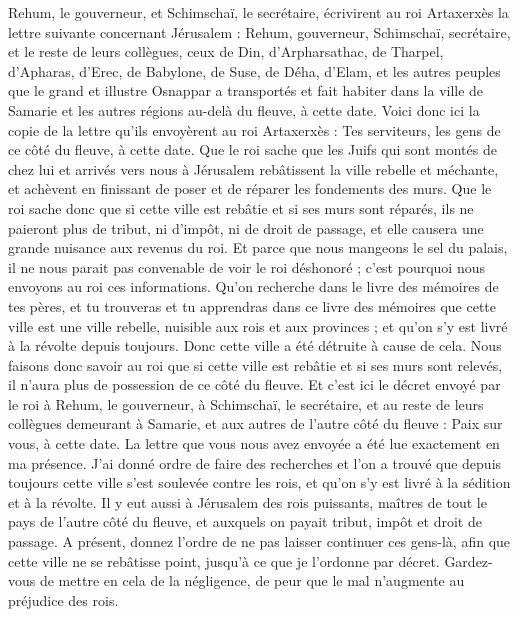 \begin{multicols}{2}
Rehum, le gouverneur, et Schimschaï, le secrétaire, écrivirent au roi Artaxerxès la lettre suivante concernant Jérusalem :
Rehum, gouverneur, Schimschaï, secrétaire, et le reste de leurs collègues, ceux de Din, d'Arpharsathac, de Tharpel, d'Apharas, d'Erec, de Babylone, de Suse, de Déha, d'Elam,
et les autres peuples que le grand et illustre Osnappar a transportés et fait habiter dans la ville de Samarie et les autres régions au-delà du fleuve, à cette date.
Voici donc ici la copie de la lettre qu'ils envoyèrent au roi Artaxerxès : Tes serviteurs, les gens de ce côté du fleuve, à cette date.
Que le roi sache que les Juifs qui sont montés de chez lui et arrivés vers nous à Jérusalem rebâtissent la ville rebelle et méchante, et achèvent en finissant de poser et de réparer les fondements des murs.
Que le roi sache donc que si cette ville est rebâtie et si ses murs sont réparés, ils ne paieront plus de tribut, ni d’impôt, ni de droit de passage, et elle causera une grande nuisance aux revenus du roi.
Et parce que nous mangeons le sel du palais, il ne nous parait pas convenable de voir le roi déshonoré ; c'est pourquoi nous envoyons au roi ces informations.
Qu'on recherche dans le livre des mémoires de tes pères, et tu trouveras et tu apprendras dans ce livre des mémoires que cette ville est une ville rebelle, nuisible aux rois et aux provinces ; et qu’on s’y est livré à la révolte depuis toujours. Donc cette ville a été détruite à cause de cela.
Nous faisons donc savoir au roi que si cette ville est rebâtie et si ses murs sont relevés, il n'aura plus de possession de ce côté du fleuve.
Et c'est ici le décret envoyé par le roi à Rehum, le gouverneur, à Schimschaï, le secrétaire, et au reste de leurs collègues demeurant à Samarie, et aux autres de l'autre côté du fleuve : Paix sur vous, à cette date.
La lettre que vous nous avez envoyée a été lue exactement en ma présence.
J'ai donné ordre de faire des recherches et l’on a trouvé  que depuis toujours cette ville s'est soulevée contre les rois, et qu'on s’y est livré à la sédition et à la révolte.
Il y eut aussi à Jérusalem des rois puissants, maîtres de tout le pays de l'autre côté du fleuve, et auxquels on payait  tribut, impôt et droit de passage.
A présent, donnez l’ordre de ne pas laisser continuer ces gens-là, afin que cette ville ne se rebâtisse point, jusqu’à ce que je l'ordonne par décret.
Gardez-vous de mettre en cela de la négligence, de peur que le mal  n’augmente au préjudice des rois.

\end{multicols}
